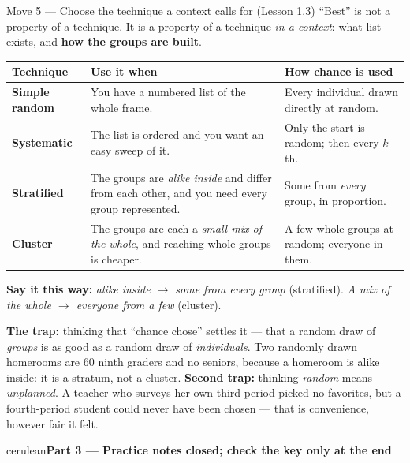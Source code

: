 \documentclass[10pt]{article}
\newcommand{\parthead}[1]{%
  \vspace{6pt}\noindent
  \begin{headlinebox}{cerulean}{\color{white}\bfseries #1}\end{headlinebox}%
  \vspace{4pt}}
\begin{document}
\vspace{3pt}
\boxguard[14]
\begin{notesbox}{Move 5 --- Choose the technique a context calls for (Lesson 1.3)}
\small
``Best'' is not a property of a technique. It is a property of a technique \emph{in a
context}: what list exists, and \textbf{how the groups are built}.

\vspace{2pt}
\renewcommand{\arraystretch}{1.25}
\begin{tabularx}{\linewidth}{@{} >{\bfseries}p{2.6cm} X X @{}}
\rowcolor{frost}
\textbf{Technique} & \textbf{Use it when} & \textbf{How chance is used} \\
\midrule
Simple random & You have a numbered list of the whole frame. & Every individual drawn
  directly at random. \\
Systematic & The list is ordered and you want an easy sweep of it. & Only the start is
  random; then every $k$th. \\
Stratified & The groups are \emph{alike inside} and differ from each other, and you need
  every group represented. & Some from \emph{every} group, in proportion. \\
Cluster & The groups are each a \emph{small mix of the whole}, and reaching whole groups is
  cheaper. & A few whole groups at random; everyone in them. \\
\end{tabularx}

\vspace{3pt}
\textbf{Say it this way:} \emph{alike inside $\rightarrow$ some from every group}
(stratified). \emph{A mix of the whole $\rightarrow$ everyone from a few} (cluster).

\vspace{3pt}
\textbf{The trap:} thinking that ``chance chose'' settles it --- that a random draw of
\emph{groups} is as good as a random draw of \emph{individuals}. Two randomly drawn homerooms
are $60$ ninth graders and no seniors, because a homeroom is alike inside: it is a stratum, not
a cluster. \textbf{Second trap:} thinking \emph{random} means \emph{unplanned}. A teacher who
surveys her own third period picked no favorites, but a fourth-period student could never have
been chosen --- that is convenience, however fair it felt.
\end{notesbox}
\normalsize

\newpage
\parthead{Part 3 --- Practice \hfill notes closed; check the key only at the end}
\end{document}
